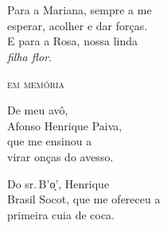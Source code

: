 



\chapter*{}
\thispagestyle{empty}

\vfill
\begin{flushright}
\small
Para a Mariana, sempre a me \\
esperar, acolher e dar forças. \\
E para a Rosa, nossa linda \\
\textit{filha flor}.

\bigskip
\medskip

\textsc{em memória}\\
\smallskip

De meu avô, \\
Afonso Henrique Paiva,\\
que me ensinou a \\
virar onças do avesso.

\smallskip

Do sr.\,B'o̖', Henrique \\
Brasil Socot, que me ofereceu a \\
primeira cuia de coca.
\end{flushright}